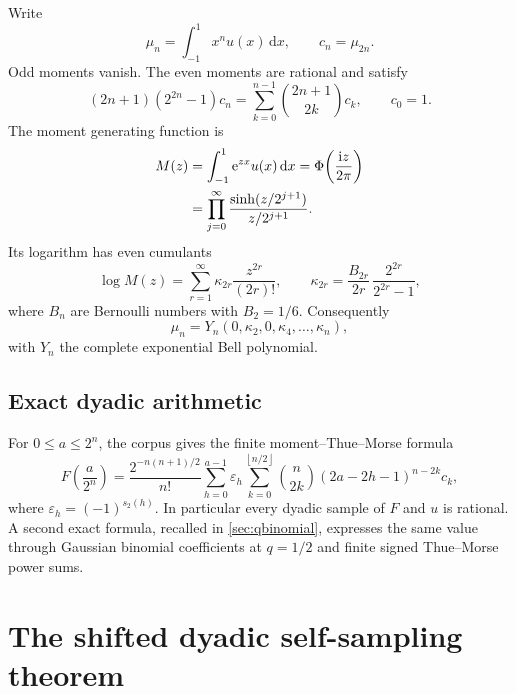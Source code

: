 \documentclass[11pt]{article}
\numberwithin{equation}{section}
\theoremstyle{definition}
\theoremstyle{remark}
\newcommand{\eps}{\varepsilon}
\newcommand{\dd}{\,\mathrm d}
\newcommand{\e}{\mathrm e}
\newcommand{\iu}{\mathrm i}
\newcommand{\floor}[1]{\left\lfloor#1\right\rfloor}
\begin{document}
Write
\begin{equation}
 \mu_n=\int_{-1}^{1}x^n u(x)\dd x,
 \qquad c_n=\mu_{2n}.
 \label{eq:moments}
\end{equation}
Odd moments vanish.  The even moments are rational and satisfy
\begin{equation}
 (2n+1)(2^{2n}-1)c_n
 =\sum_{k=0}^{n-1}\binom{2n+1}{2k}c_k,
 \qquad c_0=1.
 \label{eq:moment-recurrence}
\end{equation}
The moment generating function is
\begin{align}
 M(z)
 &=\int_{-1}^{1}\e^{zx}u(x)\dd x
 =\Phi\!\left(\frac{\iu z}{2\pi}\right)\notag\\
 &=\prod_{j=0}^{\infty}
 \frac{\sinh(z/2^{j+1})}{z/2^{j+1}}.
 \label{eq:mgf-product}
\end{align}
Its logarithm has even cumulants
\begin{equation}
 \log M(z)=\sum_{r=1}^{\infty}\kappa_{2r}\frac{z^{2r}}{(2r)!},
 \qquad
 \boxed{\displaystyle
 \kappa_{2r}=\frac{B_{2r}}{2r}\,
 \frac{2^{2r}}{2^{2r}-1}},
 \label{eq:cumulants}
\end{equation}
where $B_n$ are Bernoulli numbers with $B_2=1/6$.  Consequently
\begin{equation}
 \mu_n=Y_n(0,\kappa_2,0,\kappa_4,\ldots,\kappa_n),
 \label{eq:moment-Bell}
\end{equation}
with $Y_n$ the complete exponential Bell polynomial.

\subsection{Exact dyadic arithmetic}

For $0\le a\le2^n$, the corpus gives the finite moment--Thue--Morse formula
\begin{equation}
 F\!\left(\frac a{2^n}\right)
 =\frac{2^{-n(n+1)/2}}{n!}
 \sum_{h=0}^{a-1}\eps_h
 \sum_{k=0}^{\floor{n/2}}
 \binom n{2k}(2a-2h-1)^{n-2k}c_k,
 \label{eq:finite-F-moment}
\end{equation}
where $\eps_h=(-1)^{s_2(h)}$.  In particular every dyadic sample of $F$ and $u$ is rational.  A second exact formula, recalled in \cref{sec:qbinomial}, expresses the same value through Gaussian binomial coefficients at $q=1/2$ and finite signed Thue--Morse power sums.

\section{The shifted dyadic self-sampling theorem}
\label{sec:self-sampling}
\end{document}
